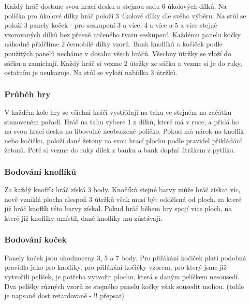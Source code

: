Každý hráč dostane svou hrací desku a stejnou sadu 6 úkolových dílků. Na políčka pro úkolové dílky hráč položí 3 úkolové dílky dle svého výběru. 
Na stůl se položí 3 panely koček - pro seskupení 3 a více, 4 a více a 5 a více stejně vzorovaných dílků bez přesně určeného tvaru seskupení. Každému panelu kočky náhodně přidělíme 2 černobílé dílky vzorů. 
Bank knoflíků a kočiček podle použitých panelů necháme v dosahu všech hráčů. 
Všechny útržky se vloží do sáčku a zamíchají. Každý hráč si vezme 2 útržky ze sáčku a vezme si je do ruky, ostatním je neukazuje. Na stůl se vyloží nabídka 3 útržků.

\subsubsection*{Průběh hry}

V každém kole hry se všichni hráči vystřídají na tahu ve stejném na začátku stanoveném pořadí. Hráč na tahu vybere 1 z dílků, které má v ruce, a přidá ho na svou hrací desku na libovolné neobsazené políčko. Pokud má nárok na knoflík nebo kočičku, položí dané žetony na svou hrací plochu podle pravidel přikládání žetonů. Poté si vezme do ruky dílek z banku a bank doplní útržkem z pytlíku.

\subsubsection*{Bodování knoflíků}
Za každý knoflík hráč získá 3 body. Knoflíků stejné barvy může hráč získat víc, nově vzniklá plocha alespoň 3 útržků však musí být oddělená od ploch, za které již hráč knoflík této barvy získal. Pokud hráč během hry spojí více ploch, na které již knoflíky umístil, dané knoflíky mu zůstávají.

\subsubsection*{Bodování koček}
Panely koček jsou ohodnoceny 3, 5 a 7 body.
Pro přilákání kočiček platí podobná pravidla jako pro knoflíky, pro přilákání kočičky vzorem, pro který jsme již vytvořili pelíšek, je potřeba vytvořit plochu, která s daným pelíškem nesousedí. Dva pelíšky různých vzorů ze stejného panelu kočky však sousedit mohou. 
(tohle je napsané dost retardovaně - !! přepsat)

